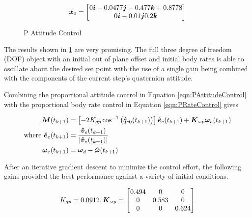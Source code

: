 \begin{equation}
  \boldsymbol{x}_0 = \begin{bmatrix} 0 \boldsymbol{i} -0.0477 \boldsymbol{j} -0.477 \boldsymbol{k} +0.8778 \\ 0 \boldsymbol{i} -0.01 \boldsymbol{j} 0.2 \boldsymbol{k} \end{bmatrix}
\end{equation}


\begin{figure}[H]
  \centerline{}
  \caption{P Attitude Control}
  \label{fig:PAttitudeControl}
\end{figure}

The results shown in \ref{fig:PAttitudeControl} are very promising.  The full three degree of freedom (DOF) object with an initial out of plane offset and initial body rates is able to oscillate about the desired set point with the use of a single gain being combined with the components of the current step's quaternion attitude.

Combining the proportional attitude control in Equation \ref{eqn:PAttitudeControl} with the proportional body rate control in Equation \ref{eqn:PRateControl} gives

\begin{subequations}
  \begin{align}
    \boldsymbol{M}(t_{k+1}) &= \left[-2 K_{qp} \cos^{-1} \big(\hat{q}_{e0}(t_{k+1}) \big) \right] \boldsymbol{\hat{e}}_e(t_{k+1}) + \boldsymbol{K}_{\omega p} \boldsymbol{\omega}_e(t_{k+1})\\
    \text{where } \boldsymbol{\hat{e}}_e(t_{k+1}) &= \frac{\boldsymbol{\hat{v}}_e(t_{k+1})}{|\boldsymbol{\hat{v}}_e(t_{k+1})|} \\
    \boldsymbol{\omega}_e(t_{k+1}) &= \boldsymbol{\omega}_d - \boldsymbol{\hat{\omega}}(t_{k+1})
  \end{align}
  \label{eqn:PAttitudeAndRateControl}
\end{subequations}

After an iterative gradient descent to minimize the control effort, the following gains provided the best performance against a variety of initial conditions.

\begin{equation}
  K_{qp} = 0.0912, \boldsymbol{K}_{\omega p} = \begin{bmatrix} 0.494 & 0 & 0 \\ 0 & 0.583 & 0 \\ 0 & 0 & 0.624 \end{bmatrix}
\end{equation}

